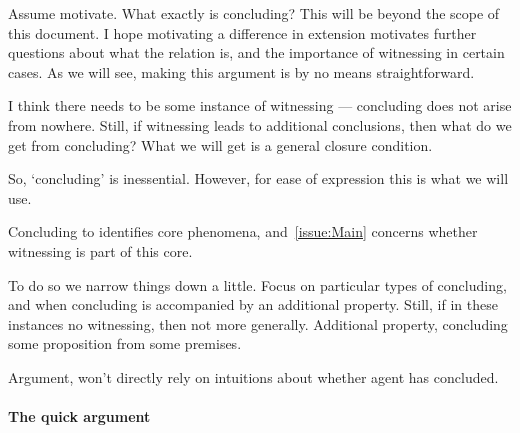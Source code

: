 \begin{note}
  Assume motivate.
  What exactly is concluding?
  This will be beyond the scope of this document.
  I hope motivating a difference in extension motivates further questions about what the relation is, and the importance of witnessing in certain cases.
  As we will see, making this argument is by no means straightforward.

  I think there needs to be some instance of witnessing --- concluding does not arise from nowhere.
  Still, if witnessing leads to additional conclusions, then what do we get from concluding?
  What we will get is a general closure condition.


  So, `concluding' is inessential.
  However, for ease of expression this is what we will use.

  Concluding to identifies core phenomena, and~\autoref{issue:Main} concerns whether witnessing is part of this core.

  To do so we narrow things down a little.
  Focus on particular types of concluding, and when concluding is accompanied by an additional property.
  Still, if in these instances no witnessing, then not more generally.
  Additional property, concluding some proposition from some premises.

  Argument, won't directly rely on intuitions about whether agent has concluded.
\end{note}

\begin{note}

\end{note}



\paragraph*{The quick argument}

